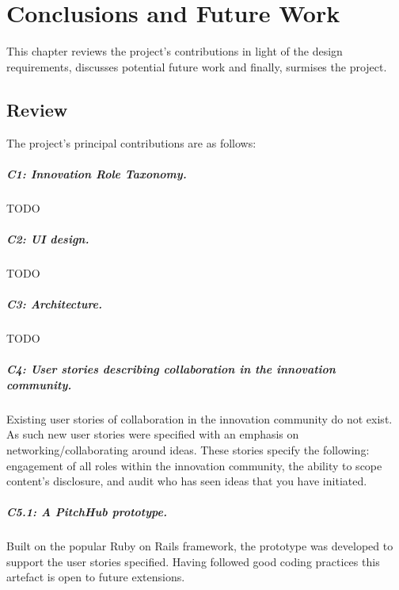 \chapter{Conclusions and Future Work}
This chapter reviews the project's contributions in light of the design requirements, discusses potential future work and finally, surmises the project.

\section{Review}

The project's principal contributions are as follows:

\paragraph{C1: Innovation Role Taxonomy.} 

TODO

\paragraph{C2: UI design.} 

TODO

\paragraph{C3: Architecture.} 

TODO

\paragraph{C4: User stories describing collaboration in the innovation community.} 

Existing user stories of collaboration in the innovation community do not exist. As such new user stories were specified with an emphasis on networking/collaborating around ideas. These stories specify the following: engagement of all roles within the innovation community, the ability to scope content's disclosure, and audit who has seen ideas that you have initiated.

\paragraph{C5.1: A PitchHub prototype.} 

Built on the popular Ruby on Rails framework, the prototype was developed to support the user stories specified. Having followed good coding practices this artefact is open to future extensions.

